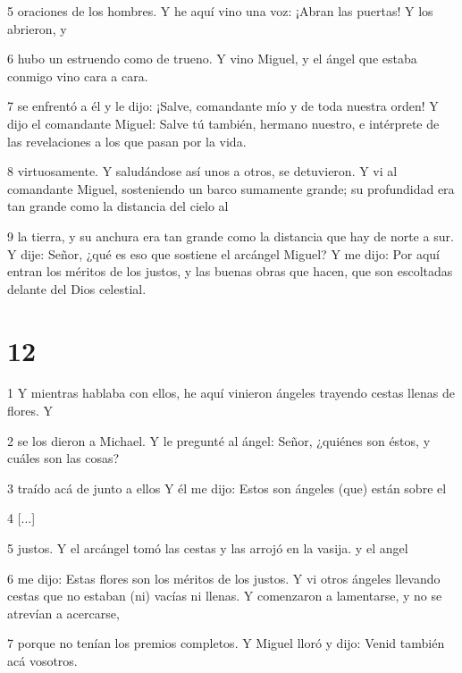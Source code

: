 \par 5 oraciones de los hombres. Y he aquí vino una voz: ¡Abran las puertas! Y los abrieron, y

\par 6 hubo un estruendo como de trueno. Y vino Miguel, y el ángel que estaba conmigo vino cara a cara.

\par 7 se enfrentó a él y le dijo: ¡Salve, comandante mío y de toda nuestra orden! Y dijo el comandante Miguel: Salve tú también, hermano nuestro, e intérprete de las revelaciones a los que pasan por la vida.

\par 8 virtuosamente. Y saludándose así unos a otros, se detuvieron. Y vi al comandante Miguel, sosteniendo un barco sumamente grande; su profundidad era tan grande como la distancia del cielo al

\par 9 la tierra, y su anchura era tan grande como la distancia que hay de norte a sur. Y dije: Señor, ¿qué es eso que sostiene el arcángel Miguel? Y me dijo: Por aquí entran los méritos de los justos, y las buenas obras que hacen, que son escoltadas delante del Dios celestial.

\chapter{12}

\par 1 Y mientras hablaba con ellos, he aquí vinieron ángeles trayendo cestas llenas de flores. Y

\par 2 se los dieron a Michael. Y le pregunté al ángel: Señor, ¿quiénes son éstos, y cuáles son las cosas?

\par 3 traído acá de junto a ellos Y él me dijo: Estos son ángeles (que) están sobre el

\par 4 [...]

\par 5 justos. Y el arcángel tomó las cestas y las arrojó en la vasija. y el angel

\par 6 me dijo: Estas flores son los méritos de los justos. Y vi otros ángeles llevando cestas que no estaban (ni) vacías ni llenas. Y comenzaron a lamentarse, y no se atrevían a acercarse,

\par 7 porque no tenían los premios completos. Y Miguel lloró y dijo: Venid también acá vosotros.

